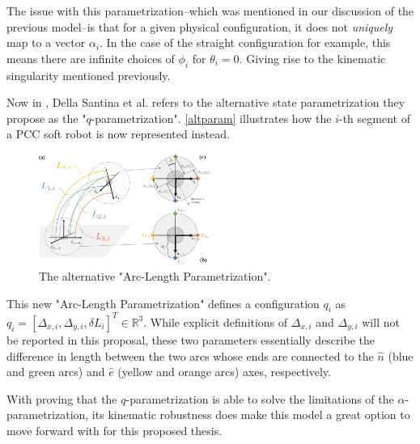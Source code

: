 The issue with this parametrization--which was mentioned in our discussion of the previous model--is that for a given physical configuration, it does not \textit{uniquely} map to a vector $\alpha_i$. In the case of the straight configuration for example, this means there are infinite choices of $\phi_i$ for $\theta_i=0$. Giving rise to the kinematic singularity mentioned previously.

Now in \cite{della_santina_improved_2020}, Della Santina et al. refers to the alternative state parametrization they propose as the "$q$-parametrization". \autoref{altparam} illustrates how the $i$-th segment of a PCC soft robot is now represented instead.

\begin{figure}[h!]
    \centering
    \includegraphics[width=0.5\textwidth]{graphics/altparam.png}
    \caption{The alternative "Arc-Length Parametrization". }
    \label{altparam}
\end{figure}

This new "Arc-Length Parametrization" defines a configuration $q_i$ as $q_i = [\Delta_{x,i}, \Delta_{y,i}, \delta L_i]^T \in \mathbb{R}^3$. While explicit definitions of $\Delta_{x,i}$ and $\Delta_{y,i}$ will not be reported in this proposal, these two parameters essentially describe the difference in length between the two arcs whose ends are connected to the $\hat{n}$ (blue and green arcs) and $\hat{e}$ (yellow and orange arcs) axes, respectively.

With \cite{della_santina_improved_2020} proving that the $q$-parametrization is able to solve the limitations of the $\alpha$-parametrization, its kinematic robustness does make this model a great option to move forward with for this proposed thesis.        